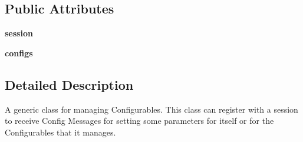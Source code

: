 \subsection*{Public Attributes}
\begin{DoxyCompactItemize}
\item 
\hypertarget{classcore_1_1conf_1_1_configurable_manager_a2cabf2cc60e378c338c0ea6869e6b341}{{\bfseries session}}\label{classcore_1_1conf_1_1_configurable_manager_a2cabf2cc60e378c338c0ea6869e6b341}

\item 
\hypertarget{classcore_1_1conf_1_1_configurable_manager_ad43a165b5d90b8a134b4b13453f5fd57}{{\bfseries configs}}\label{classcore_1_1conf_1_1_configurable_manager_ad43a165b5d90b8a134b4b13453f5fd57}

\end{DoxyCompactItemize}


\subsection{Detailed Description}
\begin{DoxyVerb}A generic class for managing Configurables. This class can register
    with a session to receive Config Messages for setting some parameters
    for itself or for the Configurables that it manages.
\end{DoxyVerb}
 

